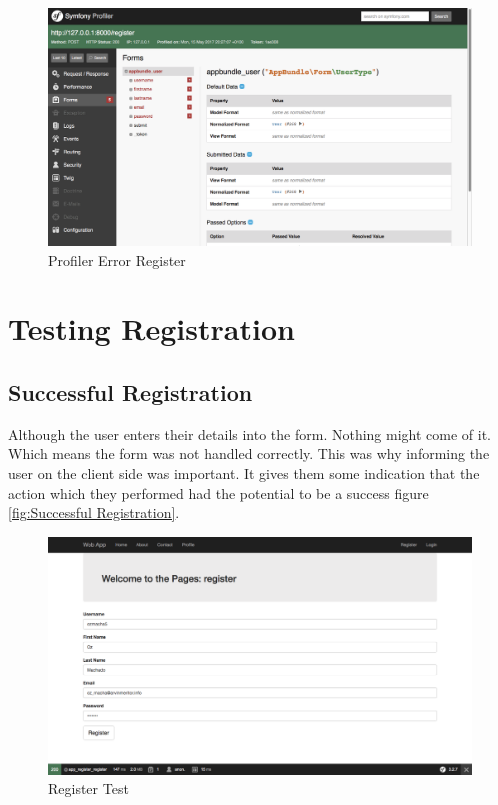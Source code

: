 \begin{figure}[htbp]
   \centering
   \includegraphics[width=400pt]{figures/profiler_error_register.png} %
   \caption{Profiler Error Register}
   \label{fig:Profiler Error Register}
\end{figure}

\section{Testing Registration}

\subsection{Successful Registration}

Although the user enters their details into the form. Nothing might come of it. Which means the form was not handled correctly. This was why informing the user on the client side was important. It gives them some indication that the action which they performed had the potential to be a success figure \ref{fig:Successful Registration}.

\begin{figure}[htbp]
   \centering
   \includegraphics[width=400pt]{figures/register_check.png} %
   \caption{Register Test}
   \label{fig:Register Test}
\end{figure}

